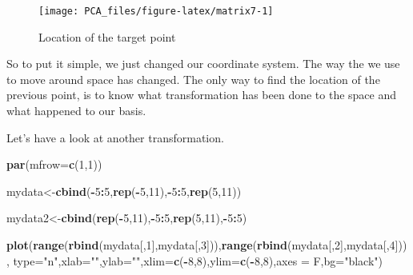 \documentclass[
]{book}
\newenvironment{Shaded}{\begin{snugshade}}{\end{snugshade}}
\newcommand{\DataTypeTok}[1]{\textcolor[rgb]{0.13,0.29,0.53}{#1}}
\newcommand{\DecValTok}[1]{\textcolor[rgb]{0.00,0.00,0.81}{#1}}
\newcommand{\KeywordTok}[1]{\textcolor[rgb]{0.13,0.29,0.53}{\textbf{#1}}}
\newcommand{\NormalTok}[1]{#1}
\newcommand{\OperatorTok}[1]{\textcolor[rgb]{0.81,0.36,0.00}{\textbf{#1}}}
\newcommand{\StringTok}[1]{\textcolor[rgb]{0.31,0.60,0.02}{#1}}
\theoremstyle{definition}
\theoremstyle{definition}
\theoremstyle{definition}
\theoremstyle{remark}
\begin{document}
\begin{figure}

{\centering \texttt{[image: PCA\_files/figure-latex/matrix7-1]} 

}

\caption{Location of the target point}\label{fig:matrix7}
\end{figure}

So to put it simple, we just changed our coordinate system. The way the we use to move around space has changed. The only way to find the location of the previous point, is to know what transformation has been done to the space and what happened to our basis.

Let's have a look at another transformation.

\begin{Shaded}
\begin{Highlighting}[]
\KeywordTok{par}\NormalTok{(}\DataTypeTok{mfrow=}\KeywordTok{c}\NormalTok{(}\DecValTok{1}\NormalTok{,}\DecValTok{1}\NormalTok{))}

\NormalTok{mydata<-}\KeywordTok{cbind}\NormalTok{(}\OperatorTok{-}\DecValTok{5}\OperatorTok{:}\DecValTok{5}\NormalTok{,}\KeywordTok{rep}\NormalTok{(}\OperatorTok{-}\DecValTok{5}\NormalTok{,}\DecValTok{11}\NormalTok{),}\OperatorTok{-}\DecValTok{5}\OperatorTok{:}\DecValTok{5}\NormalTok{,}\KeywordTok{rep}\NormalTok{(}\DecValTok{5}\NormalTok{,}\DecValTok{11}\NormalTok{))}

\NormalTok{mydata2<-}\KeywordTok{cbind}\NormalTok{(}\KeywordTok{rep}\NormalTok{(}\OperatorTok{-}\DecValTok{5}\NormalTok{,}\DecValTok{11}\NormalTok{),}\OperatorTok{-}\DecValTok{5}\OperatorTok{:}\DecValTok{5}\NormalTok{,}\KeywordTok{rep}\NormalTok{(}\DecValTok{5}\NormalTok{,}\DecValTok{11}\NormalTok{),}\OperatorTok{-}\DecValTok{5}\OperatorTok{:}\DecValTok{5}\NormalTok{)}

\KeywordTok{plot}\NormalTok{(}\KeywordTok{range}\NormalTok{(}\KeywordTok{rbind}\NormalTok{(mydata[,}\DecValTok{1}\NormalTok{],mydata[,}\DecValTok{3}\NormalTok{])),}\KeywordTok{range}\NormalTok{(}\KeywordTok{rbind}\NormalTok{(mydata[,}\DecValTok{2}\NormalTok{],mydata[,}\DecValTok{4}\NormalTok{])),}
     \DataTypeTok{type=}\StringTok{"n"}\NormalTok{,}\DataTypeTok{xlab=}\StringTok{""}\NormalTok{,}\DataTypeTok{ylab=}\StringTok{""}\NormalTok{,}\DataTypeTok{xlim=}\KeywordTok{c}\NormalTok{(}\OperatorTok{-}\DecValTok{8}\NormalTok{,}\DecValTok{8}\NormalTok{),}\DataTypeTok{ylim=}\KeywordTok{c}\NormalTok{(}\OperatorTok{-}\DecValTok{8}\NormalTok{,}\DecValTok{8}\NormalTok{),}\DataTypeTok{axes =}\NormalTok{ F,}\DataTypeTok{bg=}\StringTok{"black"}\NormalTok{)}



\end{Highlighting}
\end{Shaded}
\end{document}
